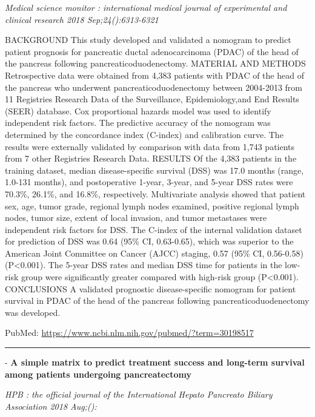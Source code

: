 \documentclass[]{article}
\begin{document}
\emph{Medical science monitor : international medical journal of
experimental and clinical research 2018 Sep;24():6313-6321}

BACKGROUND This study developed and validated a nomogram to predict
patient prognosis for pancreatic ductal adenocarcinoma (PDAC) of the
head of the pancreas following pancreaticoduodenectomy. MATERIAL AND
METHODS Retrospective data were obtained from 4,383 patients with PDAC
of the head of the pancreas who underwent pancreaticoduodenectomy
between 2004-2013 from 11 Registries Research Data of the Surveillance,
Epidemiology,and End Results (SEER) database. Cox proportional hazards
model was used to identify independent risk factors. The predictive
accuracy of the nomogram was determined by the concordance index
(C-index) and calibration curve. The results were externally validated
by comparison with data from 1,743 patients from 7 other Registries
Research Data. RESULTS Of the 4,383 patients in the training dataset,
median disease-specific survival (DSS) was 17.0 months (range, 1.0-131
months), and postoperative 1-year, 3-year, and 5-year DSS rates were
70.3\%, 26.1\%, and 16.8\%, respectively. Multivariate analysis showed
that patient sex, age, tumor grade, regional lymph nodes examined,
positive regional lymph nodes, tumor size, extent of local invasion, and
tumor metastases were independent risk factors for DSS. The C-index of
the internal validation dataset for prediction of DSS was 0.64 (95\% CI,
0.63-0.65), which was superior to the American Joint Committee on Cancer
(AJCC) staging, 0.57 (95\% CI, 0.56-0.58) (P\textless{}0.001). The
5-year DSS rates and median DSS time for patients in the low-risk group
were significantly greater compared with high-risk group
(P\textless{}0.001). CONCLUSIONS A validated prognostic disease-specific
nomogram for patient survival in PDAC of the head of the pancreas
following pancreaticoduodenectomy was developed.

PubMed: \url{https://www.ncbi.nlm.nih.gov/pubmed/?term=30198517}

{}

{}

\begin{center}\rule{0.5\linewidth}{\linethickness}\end{center}

 - \textbf{A simple matrix to predict treatment success and long-term
survival among patients undergoing pancreatectomy}

\emph{HPB : the official journal of the International Hepato Pancreato
Biliary Association 2018 Aug;():}
\end{document}
